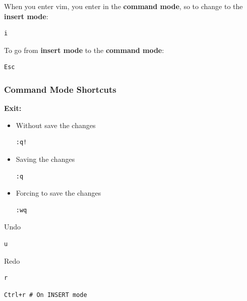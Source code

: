 \documentclass{article}
\newenvironment{codetemplate}[1][]{%
  \mybasecolorbox[#1]
  \itshape
}{%
  \endmybasecolorbox
}
\begin{document}
When you enter vim, you enter in the \textbf{command mode}, so to change to the \textbf{insert mode}:

\begin{codetemplate}{}
\begin{verbatim}
i
\end{verbatim}
\end{codetemplate}

To go from \textbf{insert mode} to the \textbf{command mode}:
\begin{codetemplate}{}
\begin{verbatim}
Esc
\end{verbatim}
\end{codetemplate}

\subsubsection{Command Mode Shortcuts}

\textbf{Exit:}

\begin{itemize}
    \item Without save the changes
\begin{codetemplate}{}
\begin{verbatim}
:q!
\end{verbatim}
\end{codetemplate}
    \item Saving the changes
\begin{codetemplate}{}
\begin{verbatim}
:q
\end{verbatim}
\end{codetemplate}

    \item Forcing to save the changes
\begin{codetemplate}{}
\begin{verbatim}
:wq
\end{verbatim}
\end{codetemplate}
\end{itemize}


Undo
\begin{codetemplate}{}
\begin{verbatim}
u
\end{verbatim}
\end{codetemplate}

Redo
\begin{codetemplate}{}
\begin{verbatim}
r
\end{verbatim}
\end{codetemplate}
\begin{codetemplate}{}
\begin{verbatim}
Ctrl+r # On INSERT mode
\end{verbatim}
\end{codetemplate}
\end{document}
